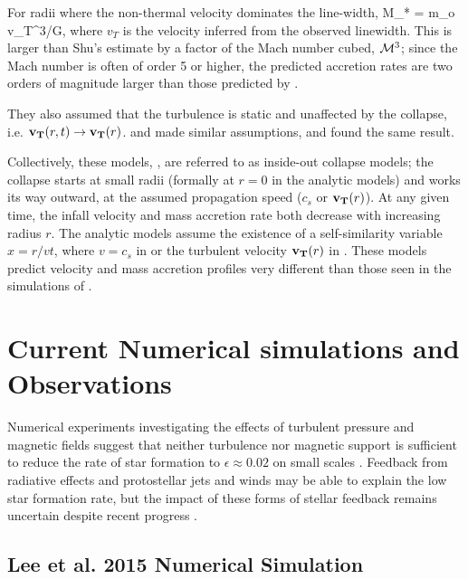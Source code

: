 \documentclass[../dissertation.tex]{subfiles}
\begin{document}
For radii where the non-thermal velocity dominates the line-width, 
%
\be
\dot M_* = m_o v_T^3/G,
\ee
%
where $v_T$ is the velocity inferred from the observed linewidth. 
This is larger than Shu's estimate by a factor of the Mach number cubed, ${\cal M}^3$; since the Mach number is often of order 5 or higher, the predicted accretion rates are two orders of magnitude larger than those predicted by \citet{1977ApJ...214..488S}.

They also assumed that the turbulence is static and unaffected by the collapse, i.e. $\mathbf{v_T} (r,t) \rightarrow \mathbf{v_T} (r)$.  
\citet{1997ApJ...476..750M} and \citet{2003ApJ...585..850M} made similar assumptions, and found the same result.  

Collectively, these models, \citep{1977ApJ...214..488S,1992ApJ...396..631M,1997ApJ...476..750M,2003ApJ...585..850M}, 
are referred to as inside-out collapse models; the collapse starts at small radii (formally at $r=0$ in the analytic models) 
and works its way outward, at the assumed propagation speed ($c_s$ or $\mathbf{v_T} (r)$). 
At any given time, the infall velocity and mass accretion rate both decrease with increasing radius $r$. 
The analytic models assume the existence of a self-similarity variable $x = r/vt$, where $v=c_s$ in 
\citet{1977ApJ...214..488S} or the turbulent velocity $\mathbf{v_T} (r)$ in \citet{1992ApJ...396..631M,1997ApJ...476..750M,2003ApJ...585..850M}.  
These models predict velocity and mass accretion profiles very different than those seen 
in the simulations of \citet{2015ApJ...800...49L}.

\section{Current Numerical simulations and Observations} \label{current_obs}
Numerical experiments investigating the effects of turbulent pressure and magnetic fields suggest that neither turbulence nor magnetic support is sufficient 
to reduce the rate of star formation to $\epsilon\approx 0.02$ on small scales
\citep{2010ApJ...709...27W,2011MNRAS.410L...8C,2011ApJ...730...40P,2012ApJ...754...71K,2014MNRAS.439.3420M}. 
Feedback from radiative effects and protostellar jets and winds may be able to explain the low star formation rate, 
but the impact of these forms of stellar feedback remains uncertain despite recent progress
\citep{2010ApJ...709...27W,2014MNRAS.439.3420M,2015MNRAS.450.4035F}.




\subsection{Lee et al. 2015 Numerical Simulation} \label{Lee15_model}
\end{document}
